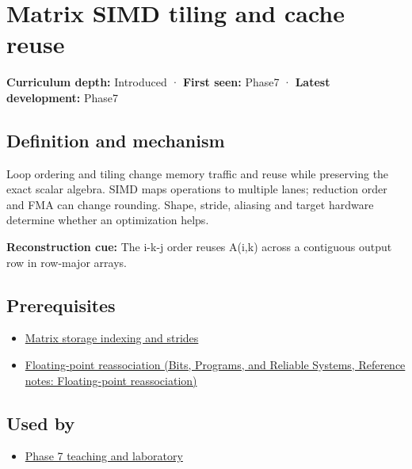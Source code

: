 \hypertarget{appendix-1bfb7c657105}{}\label{referencestart:appendix-1bfb7c657105}
\section{Matrix SIMD tiling and cache reuse}\label{appendix-1bfb7c657105-matrix-simd-tiling-and-cache-reuse}

\textbf{Curriculum depth:} Introduced · \textbf{First seen:} Phase7 · \textbf{Latest development:} Phase7

\begin{allmightroledefinition}

\subsection{Definition and mechanism}\label{appendix-1bfb7c657105-definition-and-mechanism}

Loop ordering and tiling change memory traffic and reuse while preserving the exact scalar algebra. SIMD maps operations to multiple lanes; reduction order and FMA can change rounding. Shape, stride, aliasing and target hardware determine whether an optimization helps.

\end{allmightroledefinition}

\textbf{Reconstruction cue:} The i-k-j order reuses A(i,k) across a contiguous output row in row-major arrays.

\subsection{Prerequisites}\label{appendix-1bfb7c657105-prerequisites}

\begin{itemize}
\tightlist
\item
  \hyperref[appendix-ffdc1d4e5350]{Matrix storage indexing and strides}
\item
  \href{../01-Bits-Programs-and-Reliable-Systems/main.pdf\#nameddest=appendix-c2ac4a84c283}{Floating-point reassociation (Bits, Programs, and Reliable Systems, Reference notes: Floating-point reassociation)}
\end{itemize}

\subsection{Used by}\label{appendix-1bfb7c657105-used-by}

\begin{itemize}
\tightlist
\item
  \hyperref[01-foundations-i-ch018-keep-the-promises-visible-while-moving-between-representations]{Phase 7 teaching and laboratory}
\end{itemize}

